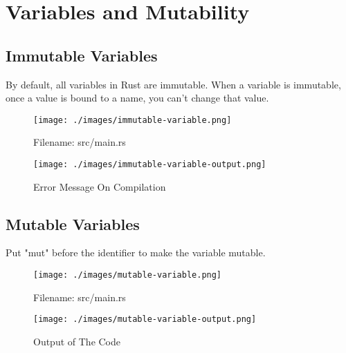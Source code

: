 \documentclass[10pt]{beamer}
\begin{document}
\section{Variables and Mutability}
\subsection{Immutable Variables}
\begin{frame}
    By default, all variables in Rust are immutable. When a variable is immutable, once a value is bound to a name, you can’t change that value.\cite{rust-book}

    \begin{figure}[htpb]
        \centering
        \texttt{[image: ./images/immutable-variable.png]}
        \vspace*{-3mm}
        \caption{Filename: src/main.rs\cite{rust-book}}
    \end{figure}

    \vspace*{-5mm}

    \begin{figure}[htpb]
        \centering
        \texttt{[image: ./images/immutable-variable-output.png]}
        \vspace*{-2mm}
        \caption{Error Message On Compilation\cite{rust-book}}
    \end{figure}

\end{frame}

\subsection{Mutable Variables}
\begin{frame}
    Put "mut" before the identifier to make the variable mutable.
    \begin{figure}[htpb]
        \centering
        \texttt{[image: ./images/mutable-variable.png]}
        \caption{Filename: src/main.rs\cite{rust-book}}
    \end{figure}

    \begin{figure}[htpb]
        \centering
        \texttt{[image: ./images/mutable-variable-output.png]}
        \caption{Output of The Code\cite{rust-book}}
    \end{figure}

\end{frame}
\end{document}
